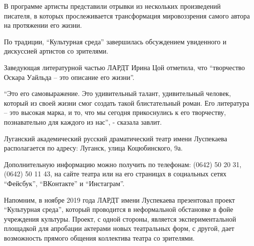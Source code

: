 В программе артисты представили отрывки из нескольких произведений писателя, в
которых прослеживается трансформация мировоззрения самого автора на протяжении
его жизни.

По традиции, \enquote{Культурная среда} завершилась обсуждением увиденного и дискуссией
артистов со зрителями.

Заведующая литературной частью ЛАРДТ Ирина Цой отметила, что \enquote{творчество Оскара
Уайльда – это описание его жизни}.

\enquote{Это его самовыражение. Это удивительный талант, удивительный человек, который
из своей жизни смог создать такой блистательный роман. Его литература – это
высокая марка, и то, что мы сегодня прикоснулись к его творчеству,
познавательно для каждого из нас}, - сказала завлит.

Луганский академический русский драматический театр имени Луспекаева
располагается по адресу: Луганск, улица Коцюбинского, 9а.

Дополнительную информацию можно получить по телефонам: (0642) 50 20 31, (0642)
50 11 43, на сайте театра или на его страницах в социальных сетях \enquote{Фейсбук},
\enquote{ВКонтакте} и \enquote{Инстаграм}.

Напомним, в ноябре 2019 года ЛАРДТ имени Луспекаева презентовал проект
\enquote{Культурная среда}, который проводится в неформальной обстановке в фойе
учреждения культуры. Проект, с одной стороны, является экспериментальной
площадкой для апробации актерами новых театральных форм, с другой, дает
возможность прямого общения коллектива театра со зрителями.
